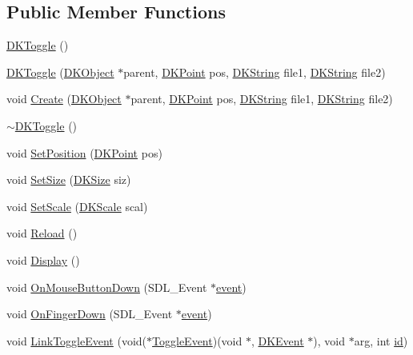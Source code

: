 \subsection*{Public Member Functions}
\begin{DoxyCompactItemize}
\item 
\hyperlink{class_d_k_toggle_a97bc02007e0c1047b2f5bb0fa579c13f}{D\-K\-Toggle} ()
\item 
\hyperlink{class_d_k_toggle_aff97aae82ca8b1e683d77b1a8a61a523}{D\-K\-Toggle} (\hyperlink{class_d_k_object}{D\-K\-Object} $\ast$parent, \hyperlink{_d_k_axis_8h_a0ca1f005fbb936f8e7a7f2433591f418}{D\-K\-Point} pos, \hyperlink{_d_k_string_8h_ac168e8555ceba18e1a2919b21976bc84}{D\-K\-String} file1, \hyperlink{_d_k_string_8h_ac168e8555ceba18e1a2919b21976bc84}{D\-K\-String} file2)
\item 
void \hyperlink{class_d_k_toggle_a0cd9fc1e32433bbcbb61cdb6c3f1fda2}{Create} (\hyperlink{class_d_k_object}{D\-K\-Object} $\ast$parent, \hyperlink{_d_k_axis_8h_a0ca1f005fbb936f8e7a7f2433591f418}{D\-K\-Point} pos, \hyperlink{_d_k_string_8h_ac168e8555ceba18e1a2919b21976bc84}{D\-K\-String} file1, \hyperlink{_d_k_string_8h_ac168e8555ceba18e1a2919b21976bc84}{D\-K\-String} file2)
\item 
\hyperlink{class_d_k_toggle_afb036dab725de76f565070977b2be73b}{$\sim$\-D\-K\-Toggle} ()
\item 
void \hyperlink{class_d_k_toggle_aeec6702f2d7d9601de05421833dc505e}{Set\-Position} (\hyperlink{_d_k_axis_8h_a0ca1f005fbb936f8e7a7f2433591f418}{D\-K\-Point} pos)
\item 
void \hyperlink{class_d_k_toggle_a4eb75f755e0507bbbd13351d96c72fe7}{Set\-Size} (\hyperlink{_d_k_axis_8h_aaa25a8c7cbf504fffdb8a4208ff7a731}{D\-K\-Size} siz)
\item 
void \hyperlink{class_d_k_toggle_aeb174df231a237b3c5bbf89e45811208}{Set\-Scale} (\hyperlink{_d_k_axis_8h_ab9e555d97d32f68d4c77474d1e1ba787}{D\-K\-Scale} scal)
\item 
void \hyperlink{class_d_k_toggle_a15dfa06d9fe527dad98039208e9706d8}{Reload} ()
\item 
void \hyperlink{class_d_k_toggle_afa86134d301576994ea843b61223ee75}{Display} ()
\item 
void \hyperlink{class_d_k_toggle_adfea4a8c23aec0e289d5d587220aaa3f}{On\-Mouse\-Button\-Down} (S\-D\-L\-\_\-\-Event $\ast$\hyperlink{class_d_k_event_a3deebb932ed734363c4ece87971bc45f}{event})
\item 
void \hyperlink{class_d_k_toggle_a6f33e157f666ecc5558a673112a23b58}{On\-Finger\-Down} (S\-D\-L\-\_\-\-Event $\ast$\hyperlink{class_d_k_event_a3deebb932ed734363c4ece87971bc45f}{event})
\item 
void \hyperlink{class_d_k_toggle_a92ae63f2717b4f5bb2fb3463124a7993}{Link\-Toggle\-Event} (void($\ast$\hyperlink{class_d_k_event_a4ee2ed8c0ba90927771fe90d253da57d}{Toggle\-Event})(void $\ast$, \hyperlink{class_d_k_event}{D\-K\-Event} $\ast$), void $\ast$arg, int \hyperlink{class_d_k_event_a46877918e12fcb3b2c8988379b6fa6fa}{id})
\end{DoxyCompactItemize}
